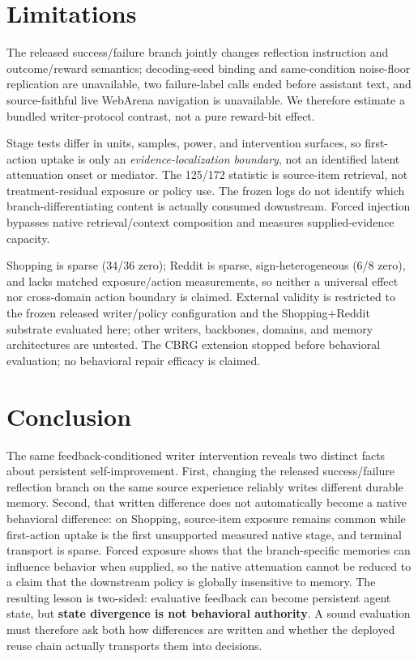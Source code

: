 \section{Limitations}
The released success/failure branch jointly changes reflection instruction and outcome/reward semantics; decoding-seed binding and same-condition noise-floor replication are unavailable, two failure-label calls ended before assistant text, and source-faithful live WebArena navigation is unavailable. We therefore estimate a bundled writer-protocol contrast, not a pure reward-bit effect.

Stage tests differ in units, samples, power, and intervention surfaces, so first-action uptake is only an \emph{evidence-localization boundary}, not an identified latent attenuation onset or mediator. The 125/172 statistic is source-item retrieval, not treatment-residual exposure or policy use. The frozen logs do not identify which branch-differentiating content is actually consumed downstream. Forced injection bypasses native retrieval/context composition and measures supplied-evidence capacity.

Shopping is sparse (34/36 zero); Reddit is sparse, sign-heterogeneous (6/8 zero), and lacks matched exposure/action measurements, so neither a universal effect nor cross-domain action boundary is claimed. External validity is restricted to the frozen released writer/policy configuration and the Shopping+Reddit substrate evaluated here; other writers, backbones, domains, and memory architectures are untested. The CBRG extension stopped before behavioral evaluation; no behavioral repair efficacy is claimed.

\section{Conclusion}
The same feedback-conditioned writer intervention reveals two distinct facts about persistent self-improvement. First, changing the released success/failure reflection branch on the same source experience reliably writes different durable memory. Second, that written difference does not automatically become a native behavioral difference: on Shopping, source-item exposure remains common while first-action uptake is the first unsupported measured native stage, and terminal transport is sparse. Forced exposure shows that the branch-specific memories can influence behavior when supplied, so the native attenuation cannot be reduced to a claim that the downstream policy is globally insensitive to memory. The resulting lesson is two-sided: evaluative feedback can become persistent agent state, but \textbf{state divergence is not behavioral authority}. A sound evaluation must therefore ask both how differences are written and whether the deployed reuse chain actually transports them into decisions.
